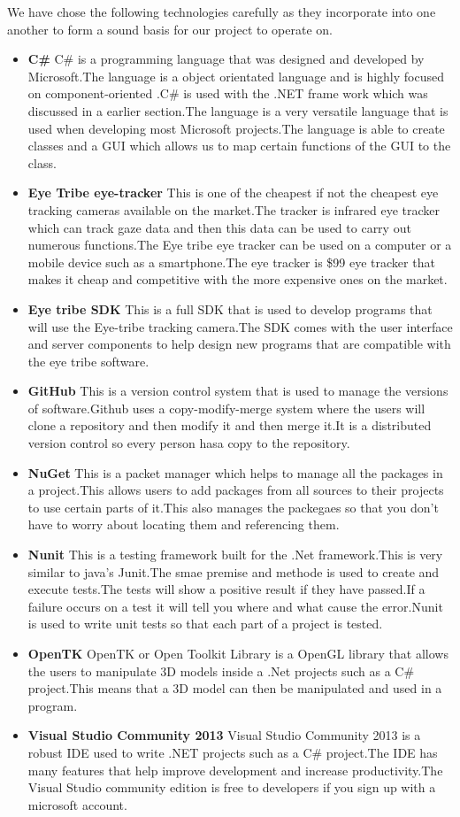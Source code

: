 We have chose the following technologies carefully as they incorporate into one another to form a sound basis for our project to operate on.

\begin{itemize}
	\item \textbf{C\#}
	C\# is a programming language that was designed and developed by Microsoft.The language is a object orientated language and is highly focused on component-oriented .C\# is used with the .NET frame work which was discussed in a earlier section.The language is a very versatile language that is used when developing most Microsoft projects.The language is able to create classes and a GUI which allows us to map certain functions of the GUI to the class.
	\item \textbf{Eye Tribe eye-tracker}
This is one of the cheapest if not the cheapest eye tracking cameras available on the market.The tracker is infrared eye tracker which can track gaze data and then this data can be used to carry out numerous functions.The Eye tribe eye tracker can be used on a computer or a mobile device such as a smartphone.The eye tracker is \$99 eye tracker that makes it cheap and competitive with the more expensive ones on the market.
	\item \textbf{Eye tribe SDK}
	This is a full SDK that is used to develop programs that will use the Eye-tribe tracking camera.The SDK comes with the user interface and server components to help design new programs that are compatible with the eye tribe software.
	\item \textbf{GitHub}
	This is a version control system that is used to manage the versions of software.Github uses a copy-modify-merge system where the users will clone a repository and then modify it and then merge it.It is a distributed version control so every person hasa copy to the repository.
		\item \textbf{NuGet}
		This is a packet manager which helps to manage all the packages in a project.This allows users to add packages from all sources to their projects to use certain parts of it.This also manages the packegaes so that you don't have to worry about locating them and referencing them.
		\item \textbf{Nunit}
This is a testing framework built for the .Net framework.This is very similar to java's Junit.The smae premise and methode is used to create and execute tests.The tests will show a positive result if they have passed.If a failure occurs on a test it will tell you where and what cause the error.Nunit is used to write unit tests so that each part of a project is tested.
		\item \textbf{OpenTK}
OpenTK or Open Toolkit Library is a OpenGL library that allows the users to manipulate 3D models inside a .Net projects such as a C\# project.This means that a 3D model can then be manipulated and used in a program.
		\item \textbf{Visual Studio Community 2013}
Visual Studio Community 2013 is a robust IDE used to write .NET projects such as a C\#  project.The IDE has many features that help improve development and increase productivity.The Visual Studio community edition is free to developers if you sign up with a microsoft account.
\end{itemize}